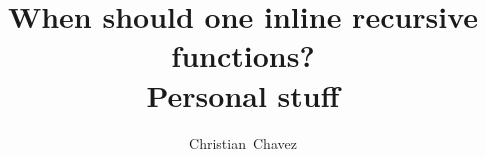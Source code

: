 \documentclass[a4paper]{article}
\begin{document}
\title{When should one inline recursive functions? \\
Personal stuff}
\author{Christian~Chavez}
\maketitle



\clearpage

\end{document}

